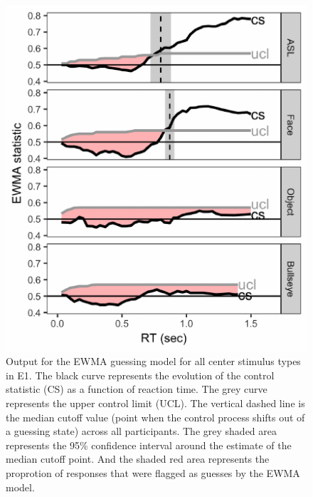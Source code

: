 \documentclass[10pt, letterpaper]{article}
\newenvironment{CodeChunk}{}{}
\begin{document}
\begin{CodeChunk}
\begin{figure}[t]

{\centering \includegraphics{figs/e1_control_chart-1} 

}

\caption[Output for the EWMA guessing model for all center stimulus types in E1]{Output for the EWMA guessing model for all center stimulus types in E1. The black curve represents the evolution of the control statistic (CS) as a function of reaction time. The grey curve represents the upper control limit (UCL). The vertical dashed line is the median cutoff value (point when the control process shifts out of a guessing state) across all participants. The grey shaded area represents the 95\% confidence interval around the estimate of the median cutoff point. And the shaded red area represents the proprotion of responses that were flagged as guesses by the EWMA model.}\label{fig:e1_control_chart}
\end{figure}
\end{CodeChunk}
\end{document}

